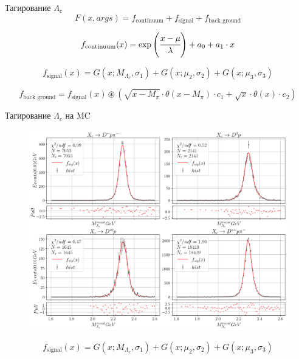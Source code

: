 \documentclass{beamer}
\newcommand{\inner}[1]{\left( #1 \right)}
\begin{document}
\begin{frame}{Тагирование $\Lambda_c$}
    \begin{equation}
        F(x, args) = f_{\text{continuum}} + f_{\text{signal}} + f_{\text{back ground}}
    \end{equation}
    
    \begin{equation}
        f_{\text{continuum}}(x) = \exp\inner{\cfrac{x-\mu}{\lambda}} + a_0 + a_1 \cdot x
    \end{equation}
           
    \begin{equation}
        f_{\text{signal}}(x) = G(x; M_{\Lambda_c}, \sigma_1) + G(x; \mu_2, \sigma_2) + G(x; \mu_3, \sigma_3)
    \end{equation}

    \begin{equation}
        f_{\text{back ground}} = f_{\text{signal}}(x) \circledast \inner{\sqrt{x-M_\pi}\cdot\theta\inner{x-M_\pi}\cdot c_1 + \sqrt{x}\cdot\theta\inner{x}\cdot c_2}
    \end{equation}
\end{frame}


\begin{frame}{Тагирование $\Lambda_c$ на MC}
    \begin{figure}[H]
        \centering
        \includegraphics[width=0.74\linewidth]{img/MC_sig_fit.png}
    \end{figure}
    \begin{equation*}
        f_{\text{signal}}(x) = G(x; M_{\Lambda_c}, \sigma_1) + G(x; \mu_2, \sigma_2) + G(x; \mu_3, \sigma_3)
    \end{equation*}
\end{frame}
\end{document}
